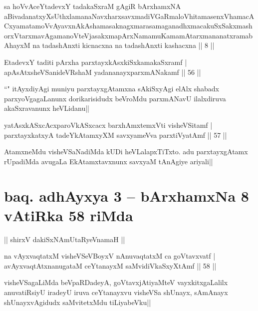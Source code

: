 \begin{shl}
sa hoVvAceYtadevxY tadakaSxraM gAgiR bArxhamxNA aBivadanatxyXsUthxlamanaNavxharxsavxmadiVGaRmaloVhitamasenxVhamacACxyamatamoV\s vAyavxnAkAshamasaknagxmarasamaganadhxmacakuSxSakxmashorxVtarxmavAgamanoV\s teVjasakxmapArxNamamuKamamAtarxmananatxramabAhayxM na tadashAnxti kicnacxna na tadashAnxti kashacxna || 8 ||
\end{shl}

\begin{shl}
EtadevxY taditi pArxha parxtayxkAsxkiSxkamakaSxramf |\\
apAsAtxsheVSanideVRshaM yadananayxparxmANakamf \hfill || 56 ||
\end{shl}

\begin{artha}
``\stext " itAyxdiyAgi muniyu parxtayxgAtamxna sAkiSxyAgi elAlx shabadx parxyoVgagaLanunx dorikarisidudx beVroMdu parxmANavU ilalxdiruva akaSxravanunx heVLidanu||
\end{artha}

\begin{shl}
yatAsxkASxcAcxparoVkASxcacx barxhAmxtemxVti visheVSitamf |\\
parxtayxkatxyA tadeYkAtamxyXM savxyameVva parxtiVyatAmf \hfill || 57 ||
\end{shl}

\begin{artha}
AtamxneMdu visheVSaNadiMda kUDi heVLalapxTiTxto. adu parxtayxgAtamx rUpadiMda avugaLa EkAtamxtavxnunx savxyaM tAnAgiye ariyali||
\end{artha}%

\section*{baq. adhAyxya 3 -- bArxhamxNa 8 vAtiRka 58 riMda}

\begin{center}%
|| shirxV dakiSxNAmUtaRyeVnamaH ||
\end{center}

\begin{shl}
na vAyxvaqtatxM visheVSeVBoyxV nAnuvaqtatxM ca goVtavxvatf |\\
avAyxvaqtAtxnanugataM ceYtanayxM saMvidiVkaSxyXtAmf \hfill || 58 ||
\end{shl}

\begin{artha}
visheVSagaLiMda beVpaRDadeyA, goVtavxjAtiyaMteV vayxkitxgaLalilx anuvatiRsiyU iradeyU iruva ceYtanayxvu visheVSa shUnayx, sAmAnayx shUnayxvAgidudx saMvitetxMdu tiLiyabeVku||
\end{artha}

